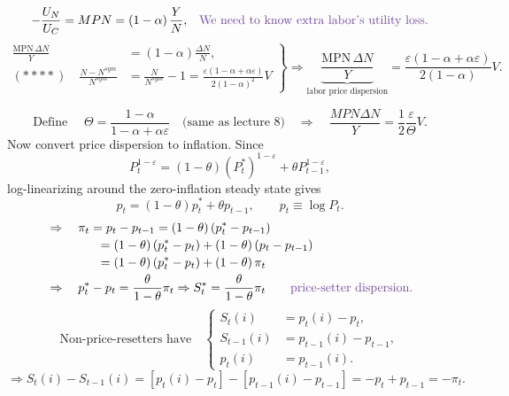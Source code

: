 \documentclass[11pt,fleqn]{article}
\newcommand{\purple}[1]{\textcolor{notePurple}{#1}}
\newcommand{\purp}[1]{\purple{#1}}
\newcommand{\MPN}{\mathrm{MPN}}
\begin{document}
\begin{align*}
-\frac{U_N}{U_C}&=MPN=\left(1-\alpha\right)\frac{Y}{N},
&\purp{\text{We need to know extra labor's utility loss.}}
\end{align*}
\[
\left.
\begin{aligned}
\frac{\MPN\,\Delta N}{Y}
&=\left(1-\alpha\right)\frac{\Delta N}{N},\\[4pt]
\left(\ast\ast\ast\ast\right)\quad
\frac{N-N^{sym}}{N^{sym}}
&=
\frac{N}{N^{sym}}-1
=
\frac{\varepsilon\left(1-\alpha+\alpha\varepsilon\right)}
{2\left(1-\alpha\right)^2}V
\end{aligned}
\right\}
\Rightarrow
\underbrace{
\frac{\MPN\,\Delta N}{Y}
}_{\text{labor price dispersion}}
=
\frac{\varepsilon\left(1-\alpha+\alpha\varepsilon\right)}
{2\left(1-\alpha\right)}V .
\]
\par\vspace{1em}
\[
\text{Define }\quad
\Theta=\frac{1-\alpha}{1-\alpha+\alpha\varepsilon}
\quad\text{(same as lecture 8)}
\quad\Rightarrow\quad
\frac{MPN\Delta N}{Y}=\frac12\frac{\varepsilon}{\Theta}V.
\]
Now convert price dispersion to inflation. Since
\[
P_t^{1-\varepsilon}
=\left(1-\theta\right)\left(P_t^*\right)^{1-\varepsilon}
+\theta P_{t-1}^{1-\varepsilon},
\]
log-linearizing around the zero-inflation steady state gives
\[
p_t=\left(1-\theta\right)p_t^*+\theta p_{t-1},
\qquad
p_t\equiv \log P_t .
\]
\begin{align*}
&\Rightarrow\quad
\pi_t=p_t-p_{t-1}
=\left(1-\theta\right)\left(p_t^*-p_{t-1}\right) \\[-1pt]
&\hspace{4.1em}
=\left(1-\theta\right)\left(p_t^*-p_t\right)+\left(1-\theta\right)\left(p_t-p_{t-1}\right) \\[-1pt]
&\hspace{4.1em}
=\left(1-\theta\right)\left(p_t^*-p_t\right)+\left(1-\theta\right)\pi_t \\[-1pt]
&\Rightarrow\quad
p_t^*-p_t=\frac{\theta}{1-\theta}\pi_t
\Rightarrow
S_t^*=\frac{\theta}{1-\theta}\pi_t
\qquad \purp{\text{price-setter dispersion.}}
\end{align*}
\[
\text{Non-price-resetters have}\quad
\left\{
\begin{aligned}
S_t\left(i\right)&=p_t\left(i\right)-p_t,\\[-1pt]
S_{t-1}\left(i\right)&=p_{t-1}\left(i\right)-p_{t-1},\\[-1pt]
p_t\left(i\right)&=p_{t-1}\left(i\right).
\end{aligned}\right.
\]
\[
\Rightarrow S_t\left(i\right)-S_{t-1}\left(i\right)
=
\left[p_t\left(i\right)-p_t\right]-\left[p_{t-1}\left(i\right)-p_{t-1}\right]
=
-p_t+p_{t-1}
=
-\pi_t.
\]
\end{document}
